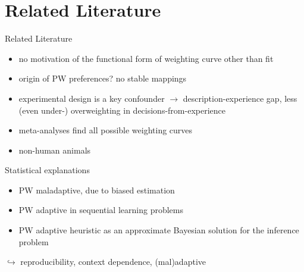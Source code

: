 \section[Literature]{Related Literature}
\begin{frame}{Related Literature}
\begin{itemize}
  \item no motivation of the functional form of weighting curve other than fit
  \item origin of PW preferences? no stable mappings \parencite{StewartETAL2015} 
  \item experimental design is a key confounder $\rightarrow$ description-experience gap, \ie less (even under-) overweighting in decisions-from-experience \parencite{HertwigETAL2004,HertwigErev2009}
  \item meta-analyses find all possible weighting curves \parencites[][Tab. 9]{UngemachETAL2009,WulffETAL2018}
  \item non-human animals \parencite{TrimmerETAL2011,AndrewsETAL2018,ConstantinopleETAL2019}
\end{itemize}
\vspace{1em}
Statistical explanations
\begin{itemize}
  \item PW maladaptive, due to biased estimation \parencite{FoxHadar2006}
  \item PW adaptive in sequential learning problems \parencite{SeoETAL2019}
	\item PW adaptive heuristic as an approximate Bayesian solution for the inference problem \parencite{Martins2006}
\end{itemize}  
\bc $\hookrightarrow$ reproducibility, context dependence, (mal)adaptive \ec 
\end{frame}

